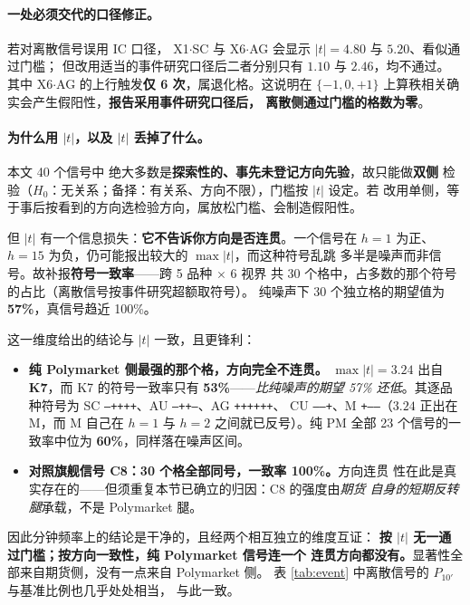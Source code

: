 \documentclass[11pt, a4paper]{ctexart}
\newcommand{\code}[1]{\texttt{\small #1}}
\begin{document}
\paragraph{一处必须交代的口径修正。}若对离散信号误用 IC 口径，
X1$\cdot$SC 与 X6$\cdot$AG 会显示 $|t|=4.80$ 与 $5.20$、看似通过门槛；
但改用适当的事件研究口径后二者分别只有 $1.10$ 与 $2.46$，均不通过。
其中 X6$\cdot$AG 的上行触发\textbf{仅 6 次}，属退化格。这说明在
$\{-1,0,+1\}$ 上算秩相关确实会产生假阳性，\textbf{报告采用事件研究口径后，
离散侧通过门槛的格数为零}。

\paragraph{为什么用 $|t|$，以及 $|t|$ 丢掉了什么。}本文 40 个信号中
绝大多数是\textbf{探索性的、事先未登记方向先验}，故只能做\textbf{双侧}
检验（$H_0$：无关系；备择：有关系、方向不限），门槛按 $|t|$ 设定。若
改用单侧，等于事后按看到的方向选检验方向，属放松门槛、会制造假阳性。

但 $|t|$ 有一个信息损失：\textbf{它不告诉你方向是否连贯}。一个信号在
$h=1$ 为正、$h=15$ 为负，仍可能报出较大的 $\max|t|$，而这种符号乱跳
多半是噪声而非信号。故补报\textbf{符号一致率}——跨 5 品种 $\times$ 6 视界
共 30 个格中，占多数的那个符号的占比（离散信号按事件研究超额取符号）。
纯噪声下 30 个独立格的期望值为 \textbf{57\%}，真信号趋近 100\%。

\noindent 这一维度给出的结论与 $|t|$ 一致，且更锋利：

\begin{itemize}
\item \textbf{纯 Polymarket 侧最强的那个格，方向完全不连贯。}
  $\max|t|=3.24$ 出自 \textbf{K7}，而 K7 的符号一致率只有
  \textbf{53\%}——\emph{比纯噪声的期望 57\% 还低}。其逐品种符号为
  SC \code{--++++}、AU \code{--++--}、AG \code{++++++}、
  CU \code{-----+}、M \code{+-----}（$3.24$ 正出在 M，而 M 自己在
  $h=1$ 与 $h=2$ 之间就已反号）。纯 PM 全部 23 个信号的一致率中位为
  \textbf{60\%}，同样落在噪声区间。
\item \textbf{对照旗舰信号 C8：30 个格全部同号，一致率 100\%。}方向连贯
  性在此是真实存在的——但须重复本节已确立的归因：C8 的强度由\emph{期货
  自身的短期反转腿}承载，不是 Polymarket 腿。
\end{itemize}

\noindent 因此分钟频率上的结论是干净的，且经两个相互独立的维度互证：
\textbf{按 $|t|$ 无一通过门槛；按方向一致性，纯 Polymarket 信号连一个
连贯方向都没有。}显著性全部来自期货侧，没有一点来自 Polymarket 侧。
表 \ref{tab:event} 中离散信号的 $P_{10'}$ 与基准比例也几乎处处相当，
与此一致。
\end{document}
